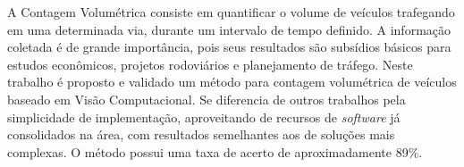 
A Contagem Volumétrica consiste em quantificar o volume de veículos trafegando em uma determinada via, durante um intervalo de tempo definido. A informação coletada é de grande importância, pois seus resultados são subsídios básicos para estudos econômicos, projetos rodoviários e planejamento de tráfego. Neste trabalho é proposto e validado um método para contagem volumétrica de veículos baseado em Visão Computacional. Se diferencia de outros trabalhos pela simplicidade de implementação, aproveitando de recursos de \textit{software} já consolidados na área, com resultados semelhantes aos de soluções mais complexas. O método possui uma taxa de acerto de aproximadamente 89\%.

